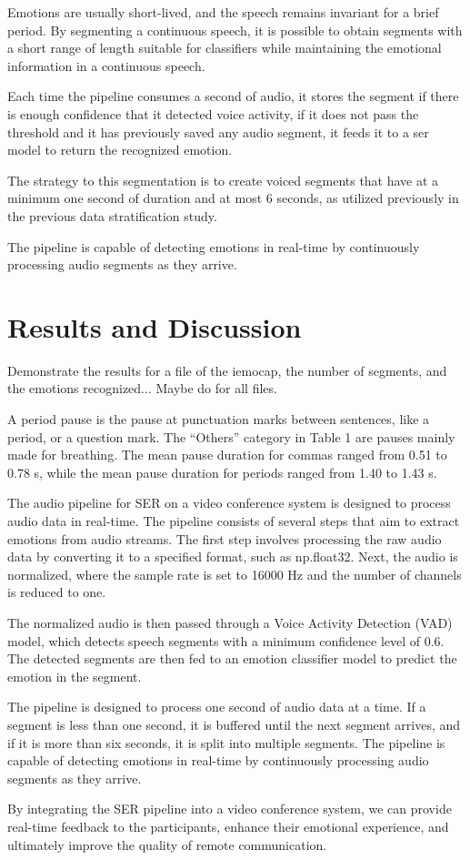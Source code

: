 Emotions are usually short-lived, and the speech remains invariant for a brief period. By segmenting a continuous speech, it is possible to obtain segments with a short range of length suitable for classifiers while maintaining the emotional information in a continuous speech.

Each time the pipeline consumes a second of audio, it stores the segment if there is enough confidence that it detected voice activity, if it does not pass the threshold and it has previously saved any audio segment, it feeds it to a \ac{ser} model to return the recognized emotion.

The strategy to this segmentation is to create voiced segments that have at a minimum one second of duration and at most 6 seconds, as utilized previously in the previous data stratification study.







The pipeline is capable of detecting emotions in real-time by continuously processing audio segments as they arrive.



\section{Results and Discussion}


Demonstrate the results for a file of the iemocap, the number of segments, and the emotions recognized... Maybe do for all files.


A period pause is the pause at punctuation marks between sentences, like a period, or a question mark. The “Others” category in Table 1 are pauses mainly made for breathing. The mean pause duration for commas ranged from 0.51 to 0.78 s, while the mean pause duration for periods ranged from 1.40 to 1.43 s.


The audio pipeline for SER on a video conference system is designed to process audio data in real-time. The pipeline consists of several steps that aim to extract emotions from audio streams. The first step involves processing the raw audio data by converting it to a specified format, such as np.float32. Next, the audio is normalized, where the sample rate is set to 16000 Hz and the number of channels is reduced to one.

The normalized audio is then passed through a Voice Activity Detection (VAD) model, which detects speech segments with a minimum confidence level of 0.6. The detected segments are then fed to an emotion classifier model to predict the emotion in the segment.

The pipeline is designed to process one second of audio data at a time. If a segment is less than one second, it is buffered until the next segment arrives, and if it is more than six seconds, it is split into multiple segments. The pipeline is capable of detecting emotions in real-time by continuously processing audio segments as they arrive.

By integrating the SER pipeline into a video conference system, we can provide real-time feedback to the participants, enhance their emotional experience, and ultimately improve the quality of remote communication.
